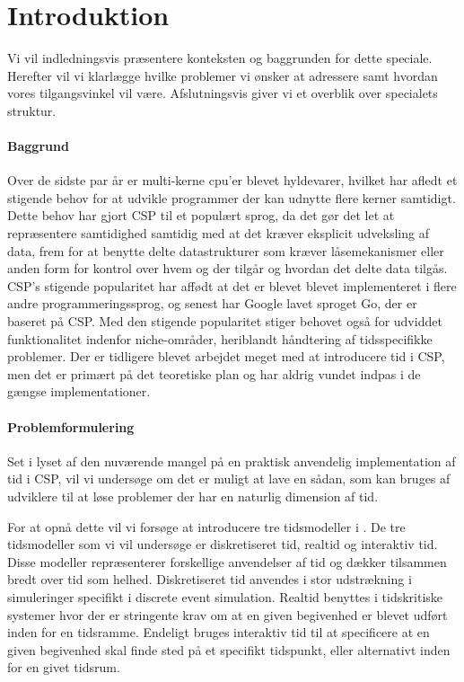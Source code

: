 \chapter{Introduktion}
Vi vil indledningsvis præsentere konteksten og baggrunden for dette speciale. Herefter vil vi klarlægge hvilke problemer vi ønsker at adressere samt hvordan vores tilgangsvinkel vil være. Afslutningsvis giver vi et overblik over specialets struktur. 

\subsubsection{Baggrund}
Over de sidste par år er multi-kerne cpu'er blevet hyldevarer, hvilket har afledt et stigende behov for at udvikle programmer der kan udnytte flere kerner samtidigt. Dette behov har gjort CSP til et populært sprog, da det gør det let at repræsentere samtidighed samtidig med at det kræver eksplicit udveksling af data, frem for at benytte delte datastrukturer som kræver låsemekanismer eller anden form for kontrol over hvem og der tilgår og hvordan det delte data tilgås. CSP's stigende popularitet har affødt at det er blevet blevet implementeret i flere andre programmeringssprog, og senest har Google lavet sproget Go, der er baseret på CSP. Med den stigende popularitet stiger behovet også for udviddet funktionalitet indenfor niche-områder, heriblandt håndtering af tidsspecifikke problemer. Der er tidligere blevet arbejdet meget med at introducere tid i CSP, men det er primært på det teoretiske plan og har aldrig vundet indpas i de gængse implementationer. 

\subsubsection{Problemformulering}
Set i lyset af den nuværende mangel på en praktisk anvendelig implementation af tid i CSP, vil vi undersøge om det er muligt at lave en sådan, som kan bruges af udviklere til at løse problemer der har en naturlig dimension af tid.

For at opnå dette vil vi forsøge at introducere tre tidsmodeller i \pycsp. De tre tidsmodeller som vi vil undersøge er diskretiseret tid, realtid og interaktiv tid. Disse modeller repræsenterer forskellige anvendelser af tid og dækker tilsammen bredt over tid som helhed. Diskretiseret tid anvendes i stor udstrækning i simuleringer specifikt i discrete event simulation. Realtid benyttes i tidskritiske systemer hvor der er stringente krav om at en given begivenhed er blevet udført inden for en tidsramme. Endeligt bruges interaktiv tid til at specificere at en given begivenhed skal finde sted på et specifikt tidspunkt, eller alternativt inden for en givet tidsrum. 

